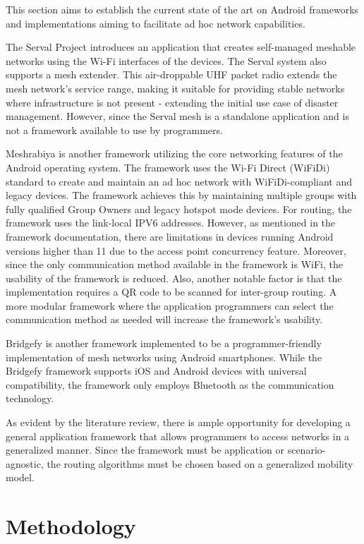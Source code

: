 \documentclass[12pt, conference, onecolumn, a4paper]{IEEEtran}
\begin{document}
This section aims to establish the current state of the art on Android
frameworks and implementations aiming to facilitate ad hoc network
capabilities.

The Serval Project introduces an application that creates self-managed meshable
networks using the Wi-Fi interfaces of the devices\cite{gardner2013}. The
Serval system also supports a mesh extender\cite{gardner2013}. This
air-droppable UHF packet radio extends the mesh network's service range, making
it suitable for providing stable networks where infrastructure is not present -
extending the initial use case of disaster management. However, since the
Serval mesh is a standalone application and is not a framework available to use
by programmers.

Meshrabiya\cite{meshrabiya} is another framework utilizing the core networking
features of the Android operating system. The framework uses the Wi-Fi Direct
(WiFiDi) standard to create and maintain an ad hoc network with
WiFiDi-compliant and legacy devices. The framework achieves this by maintaining
multiple groups with fully qualified Group Owners and legacy hotspot mode
devices. For routing, the framework uses the link-local IPV6 addresses.
However, as mentioned in the framework documentation\cite{meshrabiya}, there are
limitations in devices running Android versions higher than 11 due to the
access point concurrency feature. Moreover, since the only communication method
available in the framework is WiFi, the usability of the framework is reduced.
Also, another notable factor is that the implementation requires a QR code to
be scanned for inter-group routing.  A more modular framework where the
application programmers can select the communication method as needed will
increase the framework's usability.

Bridgefy\cite{bridgefy} is another framework implemented to be a
programmer-friendly implementation of mesh networks using Android smartphones.
While the Bridgefy framework supports iOS and Android devices with universal
compatibility, the framework only employs Bluetooth as the communication
technology.

As evident by the literature review, there is ample opportunity for developing
a general application framework that allows programmers to access networks in a
generalized manner. Since the framework must be application or
scenario-agnostic, the routing algorithms must be chosen based on a generalized
mobility model.

\section{Methodology}
\end{document}
